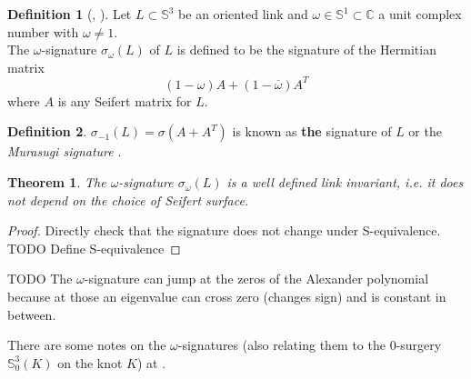 \documentclass[nobib]{tufte-book} %
\newtheorem{theorem}{Theorem}
\theoremstyle{definition}
\newtheorem{definition}{Definition}
\theoremstyle{remark}
\newcommand{\sphere}[1]{\mathbb{S}^{#1}}
\begin{document}
\begin{definition}[{\citep[Definition 8.8]{lickorish2012introduction},
	\citep[Definition 12.5]{kauffman1987knots}}]
	Let $L \subset \sphere{3}$ be an oriented link and
	$\omega \in \sphere{1} \subset \mathbb{C}$
	a unit complex number with $\omega \ne 1$. \\
	The $\omega$-signature $\sigma_{\omega}(L)$ of $L$
	is defined to be the signature of the Hermitian matrix
	\begin{equation*}
		(1 - \omega) A + (1 - \overline{\omega}) A^{T}
	\end{equation*}
	where $A$ is any Seifert matrix for $L$.
\end{definition}

\begin{definition}
	$\sigma_{-1}(L) = \sigma(A + A^{T})$
	is known as \textbf{the} signature of $L$
	or the \textit{Murasugi signature} .
\end{definition}

\begin{theorem}
	The $\omega$-signature $\sigma_{\omega}(L)$ is a well defined link invariant,
	i.e. it does not depend on the choice of Seifert surface.
\end{theorem}

\begin{proof}
	Directly check that the signature does not change under S-equivalence.
	TODO Define S-equivalence
\end{proof}

TODO The $\omega$-signature can jump at the zeros of the Alexander polynomial
because at those an eigenvalue can cross zero (changes sign)
and is constant in between.

There are some notes on the $\omega$-signatures
(also relating them to the $0$-surgery $\sphere{3}_{0}(K)$
on the knot $K$) at \citep{conway2018notes}.
\end{document}
